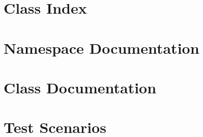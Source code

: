 \documentclass[oneside]{book}
\newcommand{\+}{\discretionary{\mbox{\scriptsize$\hookleftarrow$}}{}{}}
\begin{document}
\chapter{Class Index}


\chapter{Namespace Documentation}











\chapter{Class Documentation}














\chapter{Test Scenarios}


\backmatter
\newpage
{}
{}
\printindex
\end{document}
